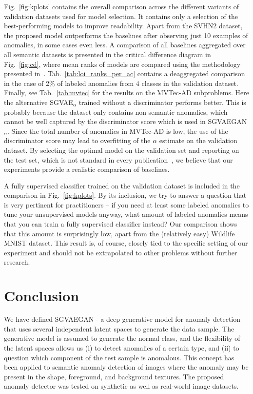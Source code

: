 Fig.~\ref{fig:kplots} contains the overall comparison across the different variants of validation datasets used for model selection. It contains only a selection of the best-performing models to improve readability. Apart from the SVHN2 dataset, the proposed model outperforms the baselines after observing just 10 examples of anomalies, in some cases even less. A comparison of all baselines aggregated over all semantic datasets is presented in the critical difference diagram in Fig.~\ref{fig:cd}, where mean ranks of models are compared using the methodology presented in~\cite{demsar2006statistical}. Tab.~\ref{tab:loi_ranks_per_ac} contains a deaggregated comparison in the case of 2\% of labeled anomalies from 4 classes in the validation dataset. Finally, see Tab.~\ref{tab:mvtec} for the results on the MVTec-AD subproblems. Here the alternative SGVAE$_{\alpha}$ trained without a discriminator performs better. This is probably because the dataset only contains non-semantic anomalies, which cannot be well captured by the discriminator score which is used in SGVAEGAN$_{\alpha}$. Since the total number of anomalies in MVTec-AD is low, the use of the discriminator score may lead to overfitting of the $\alpha$ estimate on the validation dataset. By selecting the optimal model on the validation set and reporting on the test set, which is not standard in every publication~\cite{vskvara2021comparison}, we believe that our experiments provide a realistic comparison of baselines.



A fully supervised classifier trained on the validation dataset is included in the comparison in Fig.~\ref{fig:kplots}. By its inclusion, we try to answer a question that is very pertinent for practitioners -- if you need at least some labeled anomalies to tune your unsupervised models anyway, what amount of labeled anomalies means that you can train a fully supervised classifier instead? Our comparison shows that this amount is surprisingly low, apart from the (relatively easy) Wildlife MNIST dataset. This result is, of course, closely tied to the specific setting of our experiment and should not be extrapolated to other problems without further research.

\section{Conclusion}
We have defined SGVAEGAN - a deep generative model for anomaly detection that uses several independent latent spaces to generate the data sample. The generative model is assumed to generate the normal class, and the flexibility of the latent spaces allows us (i) to detect anomalies of a certain type, and (ii) to question which component of the test sample is anomalous. This concept has been applied to semantic anomaly detection of images where the anomaly may be present in the shape, foreground, and background textures. The proposed anomaly detector was tested on synthetic as well as real-world image datasets. 

